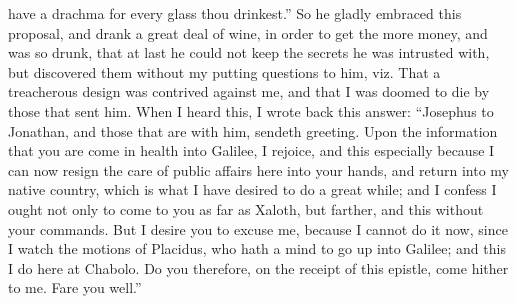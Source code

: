 have a drachma for every glass thou drinkest.'' So he gladly embraced this
proposal, and drank a great deal of wine, in order to get the more money,
and was so drunk, that at last he could not keep the secrets he was
intrusted with, but discovered them without my putting questions to him,
viz. That a treacherous design was contrived against me, and that I was
doomed to die by those that sent him. When I heard this, I wrote back this
answer: ``Josephus to Jonathan, and those that are with him, sendeth
greeting. Upon the information that you are come in health into Galilee, I
rejoice, and this especially because I can now resign the care of public
affairs here into your hands, and return into my native country, which is
what I have desired to do a great while; and I confess I ought not only to
come to you as far as Xaloth, but farther, and this without your commands.
But I desire you to excuse me, because I cannot do it now, since I watch
the motions of Placidus, who hath a mind to go up into Galilee; and this I
do here at Chabolo. Do you therefore, on the receipt of this epistle, come
hither to me. Fare you well.''

